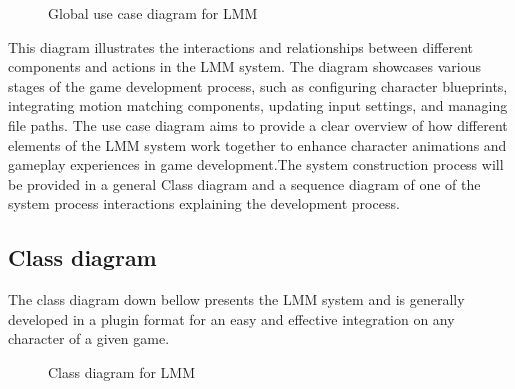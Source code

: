 \documentclass[12pt]{book}
\begin{document}
\begin{figure}[!h]
    \centering
    \caption{Global use case diagram for LMM}
\end{figure}
This diagram illustrates the interactions and relationships between different components and actions in the LMM system. The diagram showcases various stages of the game development process, such as configuring character blueprints, integrating motion matching components, updating input settings, and managing file paths. The use case diagram aims to provide a clear overview of how different elements of the LMM system work together to enhance character animations and gameplay experiences in game development.The system construction process will be provided in a general Class diagram and a sequence diagram of one of the system process interactions explaining the development process.
\subsection{Class diagram}
The class diagram down bellow presents the LMM system and is generally developed in a plugin format for an easy and effective integration on any character of a given game.
\begin{figure}
    \centering
    \caption{Class diagram for LMM}
\end{figure}
\end{document}
